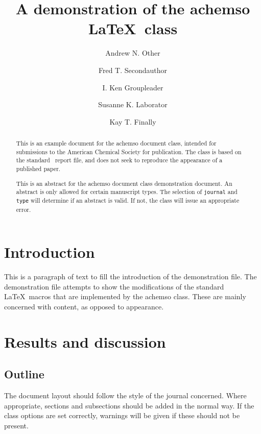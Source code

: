 \documentclass[journal=jacsat,manuscript=article]{achemso}
\author{Andrew N. Other}
\author{Fred T. Secondauthor}
\author{I. Ken Groupleader}
\affiliation[Unknown University]
{Department of Chemistry, Unknown University, Unknown Town}
\author{Susanne K. Laborator}
\affiliation[BigPharma]
{Lead Discovery, BigPharma, Big Town, USA}
\author{Kay T. Finally}
\affiliation[Unknown University]
{Department of Chemistry, Unknown University, Unknown Town}
\title[\texttt{achemso} demonstration]
{A demonstration of the \textsf{achemso} \LaTeX\ class}
\begin{document}
\begin{abstract}
  This is an example document for the \textsf{achemso} document
  class, intended for submissions to the American Chemical Society
  for publication. The class is based on the standard \LaTeXe\
  \textsf{report} file, and does not seek to reproduce the appearance
  of a published paper.

  This is an abstract for the \textsf{achemso} document class
  demonstration document.  An abstract is only allowed for certain
  manuscript types.  The selection of \texttt{journal} and
  \texttt{type} will determine if an abstract is valid.  If not, the
  class will issue an appropriate error.
\end{abstract}

\section{Introduction}
This is a paragraph of text to fill the introduction of the
demonstration file.  The demonstration file attempts to show the
modifications of the standard \LaTeX\ macros that are implemented by
the \textsf{achemso} class.  These are mainly concerned with content,
as opposed to appearance.

\section{Results and discussion}

\subsection{Outline}

The document layout should follow the style of the journal concerned.
Where appropriate, sections and subsections should be added in the
normal way. If the class options are set correctly, warnings will be
given if these should not be present.
\end{document}
